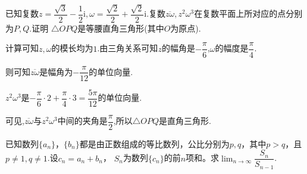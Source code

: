 \documentclass[answers]{exam}
\begin{document}
\begin{questions}
	\question 已知复数$z=\dfrac{\sqrt{3}}{2} - \dfrac12\text{i}, \omega = \dfrac{\sqrt{2}}{2} +
		\dfrac{\sqrt{2}}{2}\text{i}$.复数$\overline{z\omega},z^2\omega^3$在复数平面上所对应的点分别为$P,Q$.证明
	$\triangle{OPQ}$是等腰直角三角形(其中$O$为原点).

	\begin{solution}
		计算可知$z,\omega$的模长均为$1$.由三角关系可知$z$的幅角是$-\dfrac{\pi}{6}$,$\omega$的幅度是$\dfrac{\pi}{4}$.

		则可知$\overline{z\omega}$是幅角为$-\dfrac{\pi}{12}$的单位向量.

		$z^2\omega^3$是$-\dfrac{\pi}{6}\cdot2 + \dfrac{\pi}{4}\cdot3=\dfrac{5\pi}{12}$的单位向量.

		可见,$\overline{z\omega}$与$z^2\omega^3$中间的夹角是$\dfrac{\pi}{2}$,所以$\triangle{OPQ}$是直角三角形.
	\end{solution}

	\question 已知数列$\{a_n\}， \{b_n\}$都是由正数组成的等比数列，公比分别为$p,q$，其中$p>q$，且$p\neq1, q\neq1$.设$c_n
		= a_n+b_n$， $S_n$为数列$\{c_n\}$的前$n$项和。求$\displaystyle\lim_{n\to\infty}\dfrac{S_n}{S_{n-1}}$.


\end{questions}
\end{document}
